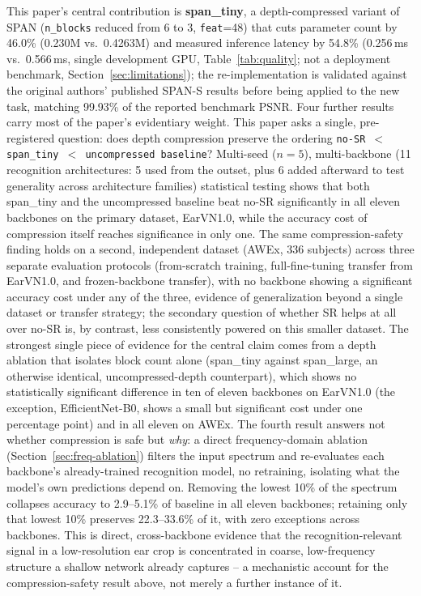 \documentclass[11pt]{article}
\begin{document}
This paper's central contribution is \textbf{span\_tiny}, a depth-compressed variant of SPAN (\texttt{n\_blocks} reduced from 6 to 3, \texttt{feat}=48) that cuts parameter count by 46.0\% (0.230M vs.\ 0.4263M) and measured inference latency by 54.8\% (0.256\,ms vs.\ 0.566\,ms, single development GPU, Table~\ref{tab:quality}; not a deployment benchmark, Section~\ref{sec:limitations}); the re-implementation is validated against the original authors' published SPAN-S results before being applied to the new task, matching 99.93\% of the reported benchmark PSNR. Four further results carry most of the paper's evidentiary weight. This paper asks a single, pre-registered question: does depth compression preserve the ordering \texttt{no-SR $<$ span\_tiny $<$ uncompressed baseline}? Multi-seed ($n=5$), multi-backbone (11 recognition architectures: 5 used from the outset, plus 6 added afterward to test generality across architecture families) statistical testing shows that both span\_tiny and the uncompressed baseline beat no-SR significantly in all eleven backbones on the primary dataset, EarVN1.0, while the accuracy cost of compression itself reaches significance in only one. The same compression-safety finding holds on a second, independent dataset (AWEx, 336 subjects) across three separate evaluation protocols (from-scratch training, full-fine-tuning transfer from EarVN1.0, and frozen-backbone transfer), with no backbone showing a significant accuracy cost under any of the three, evidence of generalization beyond a single dataset or transfer strategy; the secondary question of whether SR helps at all over no-SR is, by contrast, less consistently powered on this smaller dataset. The strongest single piece of evidence for the central claim comes from a depth ablation that isolates block count alone (span\_tiny against span\_large, an otherwise identical, uncompressed-depth counterpart), which shows no statistically significant difference in ten of eleven backbones on EarVN1.0 (the exception, EfficientNet-B0, shows a small but significant cost under one percentage point) and in all eleven on AWEx. The fourth result answers not whether compression is safe but \emph{why}: a direct frequency-domain ablation (Section~\ref{sec:freq-ablation}) filters the input spectrum and re-evaluates each backbone's already-trained recognition model, no retraining, isolating what the model's own predictions depend on. Removing the lowest 10\% of the spectrum collapses accuracy to 2.9--5.1\% of baseline in all eleven backbones; retaining only that lowest 10\% preserves 22.3--33.6\% of it, with zero exceptions across backbones. This is direct, cross-backbone evidence that the recognition-relevant signal in a low-resolution ear crop is concentrated in coarse, low-frequency structure a shallow network already captures -- a mechanistic account for the compression-safety result above, not merely a further instance of it.
\end{document}
